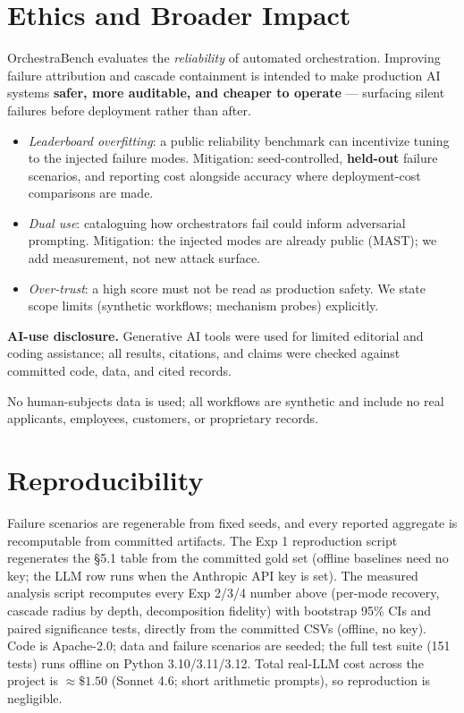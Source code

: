 \documentclass[sigconf,nonacm,anonymous]{acmart}  %
\begin{document}
\section{Ethics and Broader Impact}
OrchestraBench evaluates the \emph{reliability} of automated orchestration.
Improving failure attribution and cascade containment is intended to make
production AI systems \textbf{safer, more auditable, and cheaper to operate} ---
surfacing silent failures before deployment rather than after.
\begin{itemize}
  \item \emph{Leaderboard overfitting}: a public reliability benchmark can
  incentivize tuning to the injected failure modes. Mitigation: seed-controlled,
  \textbf{held-out} failure scenarios, and reporting cost alongside accuracy
  where deployment-cost comparisons are made.
  \item \emph{Dual use}: cataloguing how orchestrators fail could inform
  adversarial prompting. Mitigation: the injected modes are already public (MAST);
  we add measurement, not new attack surface.
  \item \emph{Over-trust}: a high score must not be read as production safety. We
  state scope limits (synthetic workflows; mechanism probes) explicitly.
\end{itemize}
\textbf{AI-use disclosure.} Generative AI tools were used for limited editorial
and coding assistance; all results, citations, and claims were checked against
committed code, data, and cited records.

No human-subjects data is used; all workflows are synthetic and include no real
applicants, employees, customers, or proprietary records.

\section{Reproducibility}
Failure scenarios are regenerable from fixed seeds, and every reported aggregate
is recomputable from committed artifacts. The Exp 1 reproduction script
regenerates the \S5.1 table from the committed gold set (offline baselines need
no key; the LLM row runs when the Anthropic API key is set). The measured
analysis script recomputes every Exp 2/3/4 number above (per-mode recovery,
cascade radius by depth, decomposition fidelity) with bootstrap 95\% CIs and
paired significance tests, directly from the committed CSVs (offline, no key).
Code is Apache-2.0; data and failure scenarios are seeded; the full test suite
(151 tests) runs offline on Python 3.10/3.11/3.12. Total real-LLM cost across the
project is $\approx\$1.50$ (Sonnet 4.6; short arithmetic prompts), so reproduction
is negligible.
\end{document}
